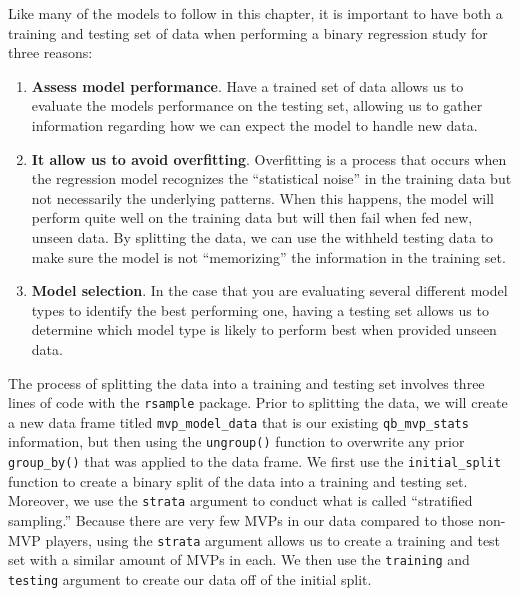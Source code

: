 \documentclass[
  letterpaper,
]{krantz}
\providecommand{\tightlist}{%
  \setlength{\itemsep}{0pt}\setlength{\parskip}{0pt}}\usepackage{longtable,booktabs,array}
\begin{document}
\begin{tcolorbox}[enhanced jigsaw, left=2mm, toprule=.15mm, opacitybacktitle=0.6, leftrule=.75mm, bottomrule=.15mm, colbacktitle=quarto-callout-important-color!10!white, breakable, colback=white, bottomtitle=1mm, toptitle=1mm, title=\textcolor{quarto-callout-important-color}{\faExclamation}\hspace{0.5em}{Important}, coltitle=black, titlerule=0mm, arc=.35mm, opacityback=0, colframe=quarto-callout-important-color-frame, rightrule=.15mm]

Like many of the models to follow in this chapter, it is important to
have both a training and testing set of data when performing a binary
regression study for three reasons:

\begin{enumerate}
\def\labelenumi{\arabic{enumi}.}
\tightlist
\item
  \textbf{Assess model performance}. Have a trained set of data allows
  us to evaluate the models performance on the testing set, allowing us
  to gather information regarding how we can expect the model to handle
  new data.
\item
  \textbf{It allow us to avoid overfitting}. Overfitting is a process
  that occurs when the regression model recognizes the ``statistical
  noise'' in the training data but not necessarily the underlying
  patterns. When this happens, the model will perform quite well on the
  training data but will then fail when fed new, unseen data. By
  splitting the data, we can use the withheld testing data to make sure
  the model is not ``memorizing'' the information in the training set.
\item
  \textbf{Model selection}. In the case that you are evaluating several
  different model types to identify the best performing one, having a
  testing set allows us to determine which model type is likely to
  perform best when provided unseen data.
\end{enumerate}

\end{tcolorbox}

The process of splitting the data into a training and testing set
involves three lines of code with the \texttt{rsample} package. Prior to
splitting the data, we will create a new data frame titled
\texttt{mvp\_model\_data} that is our existing \texttt{qb\_mvp\_stats}
information, but then using the \texttt{ungroup()} function to overwrite
any prior \texttt{group\_by()} that was applied to the data frame. We
first use the \texttt{initial\_split} function to create a binary split
of the data into a training and testing set. Moreover, we use the
\texttt{strata} argument to conduct what is called ``stratified
sampling.'' Because there are very few MVPs in our data compared to
those non-MVP players, using the \texttt{strata} argument allows us to
create a training and test set with a similar amount of MVPs in each. We
then use the \texttt{training} and \texttt{testing} argument to create
our data off of the initial split.
\end{document}
